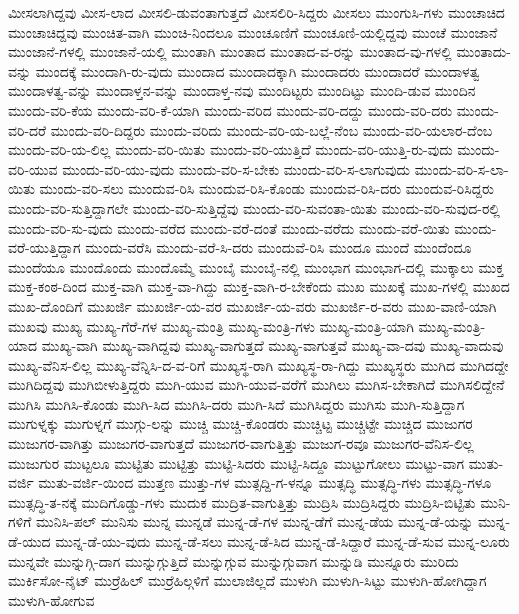 {ಮೀಸಲಾಗಿದ್ದವು
ಮೀಸ-ಲಾದ
ಮೀಸಲಿ-ಡುವಂತಾಗುತ್ತದೆ
ಮೀಸಲಿರಿ-ಸಿದ್ದರು
ಮೀಸಲು
ಮುಂಗುಸಿ-ಗಳು
ಮುಂಚಾಚಿದ
ಮುಂಚಾಚಿದ್ದವು
ಮುಂಚಿತ-ವಾಗಿ
ಮುಂಚಿ-ನಿಂದಲೂ
ಮುಂಚೂಣಿಗೆ
ಮುಂಚೂಣಿ-ಯಲ್ಲಿದ್ದವು
ಮುಂಚೆ
ಮುಂಜಾನೆ
ಮುಂಜಾನೆ-ಗಳಲ್ಲಿ
ಮುಂಜಾನೆ-ಯಲ್ಲಿ
ಮುಂತಾಗಿ
ಮುಂತಾದ
ಮುಂತಾದ-ವ-ರನ್ನು
ಮುಂತಾದ-ವು-ಗಳಲ್ಲಿ
ಮುಂತಾದು-ವನ್ನು
ಮುಂದಕ್ಕೆ
ಮುಂದಾಗಿ-ರು-ವುದು
ಮುಂದಾದ
ಮುಂದಾದಕ್ಕಾಗಿ
ಮುಂದಾದರು
ಮುಂದಾದರೆ
ಮುಂದಾಳತ್ವ
ಮುಂದಾಳತ್ವ-ವನ್ನು
ಮುಂದಾಳ್ತನ-ವನ್ನು
ಮುಂದಾಳ್ತ-ನವು
ಮುಂದಿಟ್ಟರು
ಮುಂದಿಟ್ಟು
ಮುಂದಿ-ಡುವ
ಮುಂದಿನ
ಮುಂದು-ವರಿ-ಕೆಯ
ಮುಂದು-ವರಿ-ಕೆ-ಯಾಗಿ
ಮುಂದು-ವರಿದ
ಮುಂದು-ವರಿ-ದದ್ದು
ಮುಂದು-ವರಿ-ದರು
ಮುಂದು-ವರಿ-ದರೆ
ಮುಂದು-ವರಿ-ದಿದ್ದರು
ಮುಂದು-ವರಿದು
ಮುಂದು-ವರಿ-ಯ-ಬಲ್ಲೆ-ನೆಂಬ
ಮುಂದು-ವರಿ-ಯಲಾರ-ದೆಂಬ
ಮುಂದು-ವರಿ-ಯ-ಲಿಲ್ಲ
ಮುಂದು-ವರಿ-ಯಿತು
ಮುಂದು-ವರಿ-ಯುತ್ತಿದೆ
ಮುಂದು-ವರಿ-ಯುತ್ತಿ-ರು-ವುದು
ಮುಂದು-ವರಿ-ಯುವ
ಮುಂದು-ವರಿ-ಯು-ವುದು
ಮುಂದು-ವರಿ-ಸ-ಬೇಕು
ಮುಂದು-ವರಿ-ಸ-ಲಾಗುವುದು
ಮುಂದು-ವರಿ-ಸ-ಲಾ-ಯಿತು
ಮುಂದು-ವರಿ-ಸಲು
ಮುಂದುವ-ರಿಸಿ
ಮುಂದುವ-ರಿಸಿ-ಕೊಂಡು
ಮುಂದುವ-ರಿಸಿ-ದರು
ಮುಂದುವ-ರಿಸಿದ್ದರು
ಮುಂದು-ವರಿ-ಸುತ್ತಿದ್ದಾಗಲೇ
ಮುಂದು-ವರಿ-ಸುತ್ತಿದ್ದೆವು
ಮುಂದು-ವರಿ-ಸುವಂತಾ-ಯಿತು
ಮುಂದು-ವರಿ-ಸುವುದ-ರಲ್ಲಿ
ಮುಂದು-ವರಿ-ಸು-ವುದು
ಮುಂದು-ವರೆದ
ಮುಂದು-ವರೆ-ದಂತೆ
ಮುಂದು-ವರೆದು
ಮುಂದು-ವರೆ-ಯಿತು
ಮುಂದು-ವರೆ-ಯುತ್ತಿದ್ದಾಗ
ಮುಂದು-ವರೆಸಿ
ಮುಂದು-ವರೆ-ಸಿ-ದರು
ಮುಂದುವೆ-ರಿಸಿ
ಮುಂದೂ
ಮುಂದೆ
ಮುಂದೆಂದೂ
ಮುಂದೆಯೂ
ಮುಂದೊಂದು
ಮುಂದೊಮ್ಮೆ
ಮುಂಬೈ
ಮುಂಬೈ-ನಲ್ಲಿ
ಮುಂಭಾಗ
ಮುಂಭಾಗ-ದಲ್ಲಿ
ಮುಕ್ಕಾಲು
ಮುಕ್ತ
ಮುಕ್ತ-ಕಂಠ-ದಿಂದ
ಮುಕ್ತ-ವಾಗಿ
ಮುಕ್ತ-ವಾ-ಗಿದ್ದು
ಮುಕ್ತ-ವಾಗಿ-ರ-ಬೇಕೆಂದು
ಮುಖ
ಮುಖಕ್ಕೆ
ಮುಖ-ಗಳಲ್ಲಿ
ಮುಖದ
ಮುಖ-ದೊಂದಿಗೆ
ಮುಖರ್ಜಿ
ಮುಖರ್ಜಿ-ಯ-ವರ
ಮುಖರ್ಜಿ-ಯ-ವರು
ಮುಖರ್ಜಿ-ರ-ವರು
ಮುಖ-ವಾಣಿ-ಯಾಗಿ
ಮುಖವು
ಮುಖ್ಯ
ಮುಖ್ಯ-ಗೆರೆ-ಗಳ
ಮುಖ್ಯ-ಮಂತ್ರಿ
ಮುಖ್ಯ-ಮಂತ್ರಿ-ಗಳು
ಮುಖ್ಯ-ಮಂತ್ರಿ-ಯಾಗಿ
ಮುಖ್ಯ-ಮಂತ್ರಿ-ಯಾದ
ಮುಖ್ಯ-ವಾಗಿ
ಮುಖ್ಯ-ವಾಗಿದ್ದವು
ಮುಖ್ಯ-ವಾಗುತ್ತದೆ
ಮುಖ್ಯ-ವಾಗುತ್ತವೆ
ಮುಖ್ಯ-ವಾ-ದವು
ಮುಖ್ಯ-ವಾದುವು
ಮುಖ್ಯ-ವೆನಿಸ-ಲಿಲ್ಲ
ಮುಖ್ಯ-ವೆನ್ನಿಸಿ-ದ-ವ-ರಿಗೆ
ಮುಖ್ಯಸ್ಥ-ರಾಗಿ
ಮುಖ್ಯಸ್ಥ-ರಾ-ಗಿದ್ದು
ಮುಖ್ಯಸ್ಥರು
ಮುಗಿದ
ಮುಗಿದದ್ದೇ
ಮುಗಿದಿದ್ದವು
ಮುಗಿಬೀಳುತ್ತಿದ್ದರು
ಮುಗಿ-ಯುವ
ಮುಗಿ-ಯುವ-ವರೆಗೆ
ಮುಗಿಲು
ಮುಗಿಸ-ಬೇಕಾಗಿದೆ
ಮುಗಿಸಲಿದ್ದೇನೆ
ಮುಗಿಸಿ
ಮುಗಿಸಿ-ಕೊಂಡು
ಮುಗಿ-ಸಿದ
ಮುಗಿಸಿ-ದರು
ಮುಗಿ-ಸಿದೆ
ಮುಗಿಸಿದ್ದರು
ಮುಗಿಸು
ಮುಗಿ-ಸುತ್ತಿದ್ದಾಗ
ಮುಗುಳ್ನಕ್ಕು
ಮುಗುಳ್ನಗೆ
ಮುಗ್ಗು-ಲನ್ನು
ಮುಚ್ಚಿ
ಮುಚ್ಚಿ-ಕೊಂಡರು
ಮುಚ್ಚಿಟ್ಟ
ಮುಚ್ಚಿಟ್ಟೇ
ಮುಚ್ಚಿದ
ಮುಜುಗರ
ಮುಜುಗರ-ವಾಗಿತ್ತು
ಮುಜುಗರ-ವಾಗುತ್ತದೆ
ಮುಜುಗರ-ವಾಗುತ್ತಿತ್ತು
ಮುಜುಗ-ರವೂ
ಮುಜುಗರ-ವೆನಿಸ-ಲಿಲ್ಲ
ಮುಜುಗುರ
ಮುಟ್ಟಲೂ
ಮುಟ್ಟಿತು
ಮುಟ್ಟಿತ್ತು
ಮುಟ್ಟಿ-ಸಿದರು
ಮುಟ್ಟಿ-ಸಿದ್ದೂ
ಮುಟ್ಟುಗೋಲು
ಮುಟ್ಟು-ವಾಗ
ಮುತು-ವರ್ಜಿ
ಮುತು-ವರ್ಜಿ-ಯಿಂದ
ಮುತ್ತಣ
ಮುತ್ತು-ಗಳ
ಮುತ್ಸದ್ದಿ-ಗ-ಳನ್ನೂ
ಮುತ್ಸದ್ಧಿ
ಮುತ್ಸದ್ಧಿ-ಗಳು
ಮುತ್ಸದ್ಧಿ-ಗಳೂ
ಮುತ್ಸದ್ಧಿ-ತ-ನಕ್ಕೆ
ಮುದಿಗೊಡ್ಡು-ಗಳು
ಮುದುಕ
ಮುದ್ರಿತ-ವಾಗುತ್ತಿತ್ತು
ಮುದ್ರಿಸಿ
ಮುದ್ರಿಸಿದ್ದರು
ಮುದ್ರಿಸಿ-ಬಿಟ್ಟಿತು
ಮುನಿ-ಗಳಿಗೆ
ಮುನಿಸಿ-ಪಲ್
ಮುನಿಸು
ಮುನ್ನ
ಮುನ್ನಡೆ
ಮುನ್ನ-ಡೆ-ಗಳ
ಮುನ್ನ-ಡೆಗೆ
ಮುನ್ನ-ಡೆಯ
ಮುನ್ನ-ಡೆ-ಯನ್ನು
ಮುನ್ನ-ಡೆ-ಯುದ
ಮುನ್ನ-ಡೆ-ಯು-ವುದು
ಮುನ್ನ-ಡೆ-ಸಲು
ಮುನ್ನ-ಡೆ-ಸಿದ
ಮುನ್ನ-ಡೆ-ಸಿದ್ದಾರೆ
ಮುನ್ನ-ಡೆ-ಸುವ
ಮುನ್ನ-ಲೂರು
ಮುನ್ನವೇ
ಮುನ್ನುಗ್ಗಿ-ದಾಗ
ಮುನ್ನುಗ್ಗುತ್ತಿದೆ
ಮುನ್ನುಗ್ಗುವ
ಮುನ್ನುಗ್ಗುವಾಗ
ಮುನ್ನುಡಿ
ಮುನ್ನೂರು
ಮುರಿದು
ಮುರ್ಕಿಸೋ-ನೈಟ್
ಮುರ್ರೆಹಿಲ್
ಮುರ್ರೆಹಿಲ್ಗಳಿಗೆ
ಮುಲಾಜಿಲ್ಲದೆ
ಮುಳುಗಿ
ಮುಳುಗಿ-ಸಿಟ್ಟು
ಮುಳುಗಿ-ಹೋಗಿದ್ದಾಗ
ಮುಳುಗಿ-ಹೋಗುವ
}
